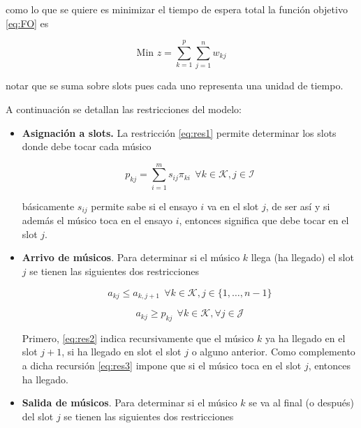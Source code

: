 \documentclass[journal, 10pt]{IEEEtran}
\begin{document}
como lo que se quiere es minimizar el tiempo de espera total la función objetivo \eqref{eq:FO} es 

\begin{equation} \label{eq:FO}
\text{Min } z = \sum_{k=1}^{p}\sum_{j=1}^n w_{kj} 
\end{equation}

notar que se suma sobre slots pues cada uno representa una unidad de tiempo. 

A continuación se detallan las restricciones del modelo:

\begin{itemize}



\item \textbf{Asignación a slots.} La restricción \eqref{eq:res1} permite determinar los slots donde debe tocar cada músico

\begin{equation} \label{eq:res1}
	p_{kj} = \sum_{i=1}^m s_{ij} \pi_{ki} \ \ \forall k \in \mathcal{K}, j \in \mathcal{I}
\end{equation}

básicamente $s_{ij}$ permite sabe si el ensayo $i$ va en el slot $j$, de ser así y si además el músico toca en el ensayo $i$, entonces significa que debe tocar en el slot $j$.



\item \textbf{Arrivo de músicos}. Para determinar si el músico $k$ llega (ha llegado) el slot $j$ se tienen las siguientes dos restricciones

\begin{equation}\label{eq:res2} 
	a_{kj} \leq a_{k,j+1} \ \ \forall k \in \mathcal{K}, j \in \{1,\ldots,n-1\}
\end{equation}

\begin{equation}\label{eq:res3} 
	a_{kj} \geq p_{kj} \ \ \forall k \in \mathcal{K}, \forall j \in \mathcal{J}
\end{equation}

Primero, \eqref{eq:res2} indica recursivamente que el músico $k$ ya ha llegado en el slot $j+1$, si ha llegado en slot el slot $j$ o alguno anterior. Como complemento a dicha recursión \eqref{eq:res3} impone que si el músico toca en el slot $j$, entonces ha llegado. 



\item \textbf{Salida de músicos}. Para determinar si el músico $k$ se va al final (o después) del slot $j$ se tienen las siguientes dos restricciones


\end{itemize}
\end{document}
